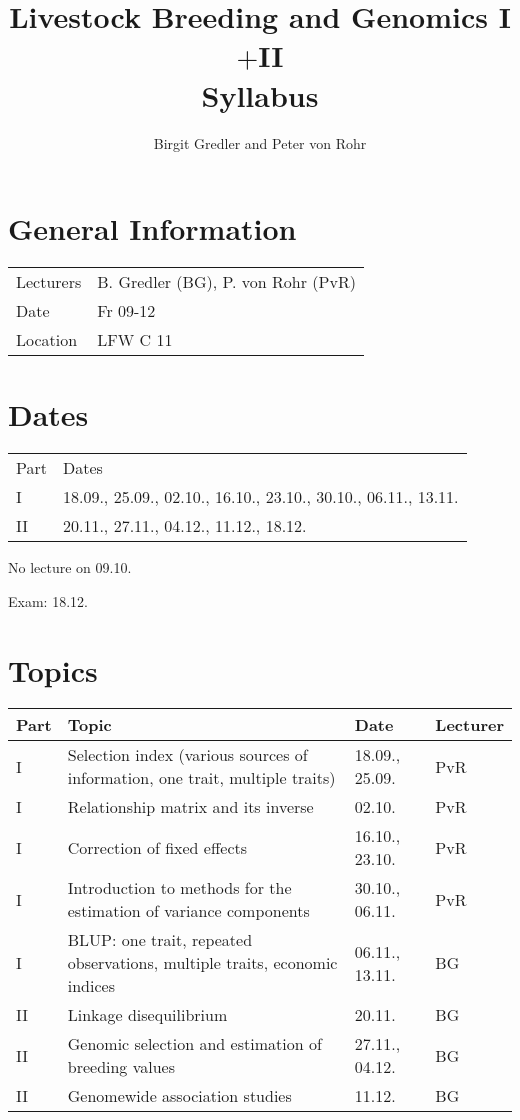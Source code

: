 \documentclass{article}
\title{Livestock Breeding and Genomics I$+$II\\Syllabus}
\author{Birgit Gredler and Peter von Rohr}
\begin{document}
\maketitle

\section*{General Information}
\begin{tabular}{p{2.5cm}p{8cm}}
Lecturers & B. Gredler (BG), P. von Rohr (PvR)\\
Date      & Fr	09-12              \\
Location  & LFW C 11               \\
\end{tabular}

\section*{Dates}
\begin{tabular}{p{2.5cm}p{8cm}}
Part  &  Dates \\
I     & 18.09., 25.09., 02.10., 16.10., 23.10., 30.10., 06.11., 13.11.\\
II    & 20.11., 27.11., 04.12., 11.12., 18.12.\\
\end{tabular}

\vspace{2ex}
\noindent No lecture on 09.10.

\vspace{2ex}
\noindent Exam: 18.12.

\section*{Topics}

\begin{tabular}{|p{1cm}|p{7cm}|p{1.5cm}|p{1.5cm}|}
\hline
Part & Topic & Date & Lecturer \\
\hline
I    & Selection index (various sources of information, one trait, multiple traits)
     & 18.09., 25.09.
     & PvR\\
\hline
I    & Relationship matrix and its inverse
     & 02.10.
     & PvR\\
\hline
I    & Correction of fixed effects
     & 16.10., 23.10.
     & PvR\\
\hline
I    & Introduction to methods for the estimation of variance components
     & 30.10., 06.11.
     & PvR\\
\hline
I    & BLUP: one trait, repeated observations, multiple traits, economic indices
     & 06.11., 13.11.
     & BG\\
\hline\hline
II   & Linkage disequilibrium
     & 20.11.
     & BG\\
\hline
II   & Genomic selection and estimation of breeding values
     & 27.11., 04.12.
     & BG\\
\hline
II   & Genomewide association studies
     & 11.12.
     & BG\\
\hline

\end{tabular}
\end{document}
